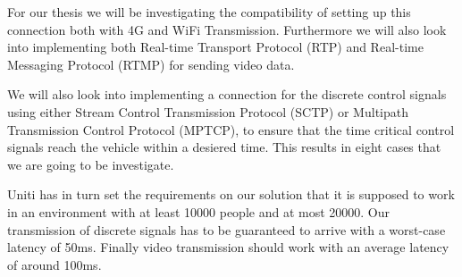\documentclass[a4paper]{article}
\begin{document}
For our thesis we will be investigating the compatibility of setting up this
connection both with 4G and WiFi Transmission. Furthermore we will also look
into implementing both Real-time Transport Protocol (RTP) and Real-time
Messaging Protocol (RTMP) for sending video data. 

We will also look into implementing a connection for the discrete control
signals using either Stream Control Transmission Protocol (SCTP) or Multipath
Transmission Control Protocol (MPTCP), to ensure that the time critical control
signals reach the vehicle within a desiered time. This results in eight cases
that we are going to be investigate.

Uniti has in turn set the requirements on our solution that it is supposed to
work in an environment with at least 10000 people and at most 20000. Our
transmission of discrete signals has to be guaranteed to arrive with a
worst-case latency of 50ms. Finally video transmission should work with an
average latency of around 100ms.
 







\end{document}
